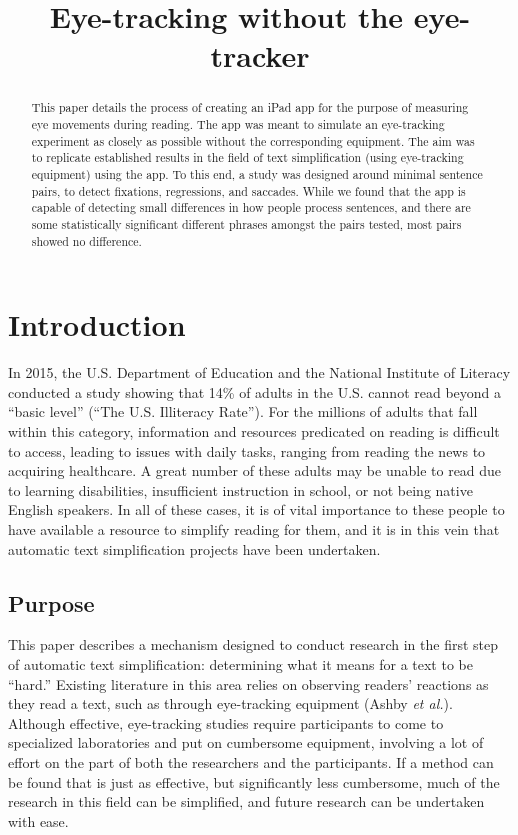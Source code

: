 \documentclass[11pt,letterpaper]{article}
\title{Eye-tracking without the eye-tracker
	}
\begin{document}
	\maketitle
	\begin{abstract}
		This paper details the process of creating an iPad app for the purpose of measuring eye movements during reading. The app was meant to simulate an eye-tracking experiment as closely as possible without the corresponding equipment. The aim was to replicate established results in the field of text simplification (using eye-tracking equipment) using the app. To this end, a study was designed around minimal sentence pairs, to detect fixations, regressions, and saccades. While we found that the app is capable of detecting small differences in how people process sentences, and there are some statistically significant different phrases amongst the pairs tested, most pairs showed no difference.
	\end{abstract}
	
	\section{Introduction}
	
	In 2015, the U.S. Department of Education and the National Institute of Literacy conducted a study showing that 14\% of adults in the U.S. cannot read beyond a ``basic level'' (``The U.S. Illiteracy Rate''). For the millions of adults that fall within this category, information and resources predicated on reading is difficult to access, leading to issues with daily tasks, ranging from reading the news to acquiring healthcare. A great number of these adults may be unable to read due to learning disabilities, insufficient instruction in school, or not being native English speakers. In all of these cases, it is of vital importance to these people to have available a resource to simplify reading for them, and it is in this vein that automatic text simplification projects have been undertaken.
	
	\subsection{Purpose}
	
	This paper describes a mechanism designed to conduct research in the first step of automatic text simplification: determining what it means for a text to be ``hard.'' Existing literature in this area relies on observing readers' reactions as they read a text, such as through eye-tracking equipment (Ashby \textit{et al.}). Although effective, eye-tracking studies require participants to come to specialized laboratories and put on cumbersome equipment, involving a lot of effort on the part of both the researchers and the participants. If a method can be found that is just as effective, but significantly less cumbersome, much of the research in this field can be simplified, and future research can be undertaken with ease.
	
\end{document}
